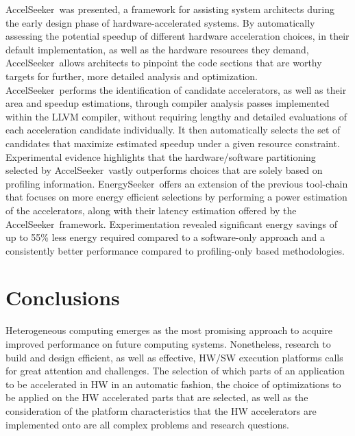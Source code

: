 \documentclass[]{usiinfthesis}
\newcommand{\aseeker}{{AccelSeeker}}
\newcommand{\eseeker}{{EnergySeeker}}
\begin{document}
\aseeker\ was presented, a framework for assisting system architects during the early design phase of hardware-accelerated systems. By automatically assessing the potential speedup of different hardware acceleration choices, in their default implementation, as well as the hardware resources they demand, \aseeker\ allows architects to pinpoint the code sections that are worthy targets for further, more detailed analysis and optimization. \aseeker\ performs the identification of candidate accelerators, as well as their area and speedup estimations, through compiler analysis passes implemented within the LLVM compiler, without requiring lengthy and detailed evaluations of each acceleration candidate individually. It then automatically selects the set of candidates that maximize estimated speedup under a given resource constraint. Experimental evidence highlights that the hardware/software partitioning selected by \aseeker\ vastly outperforms choices that are solely based on profiling information.
%
%
\eseeker\ offers an extension of the previous tool-chain that focuses on more energy efficient selections by performing a power estimation of the accelerators, along with their latency estimation offered by the \aseeker\ framework. Experimentation revealed significant energy savings of up to 55\% less energy required compared to a software-only approach and a consistently better performance compared to profiling-only based methodologies.




%
%
%
%
%
%
%
%
%
%



\chapter*{Conclusions}

Heterogeneous computing emerges as the most promising approach to acquire improved performance on future computing systems. Nonetheless, research to build and design efficient, as well as effective, HW/SW execution platforms calls for great attention and challenges.
The selection of which parts of an application to be accelerated in HW in an automatic
fashion, the choice of optimizations to be applied on the HW accelerated parts that are
selected, as well as the consideration of the platform characteristics that the HW
accelerators are implemented onto are all complex problems and research questions.\par
\end{document}
